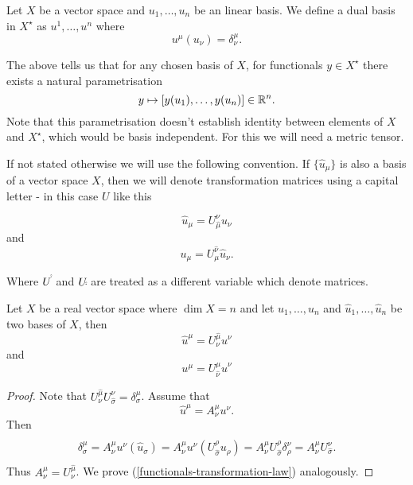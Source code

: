 \documentclass[main.tex]{subfiles}
\begin{document}
\begin{definition}
Let $X$ be a vector space and $u_1, \dots, u_n$ be an linear basis. We define a dual basis in $X^\star$ as $u^1, \dots, u^n$ where
\begin{equation}
u^\mu(u_\nu) = \delta^\mu_\nu. 
\end{equation} 
\end{definition}

The above tells us that for any chosen basis of $X$, for functionals $y\in X^\star$ there exists a natural parametrisation 
\begin{equation}
y \mapsto [y(u_1), \dots, y(u_n)]\in \mathbb{R}^n. 
\end{equation}
Note that this parametrisation doesn't establish identity between elements of $X$ and $X^\star$, which would be basis independent. For this we will need a metric tensor.

If not stated otherwise we will use the following convention. If $\{\hat{u}_\mu\}$ is also a basis of a vector space $X$, then we will denote transformation matrices using a capital letter - in this case $U$ like this

\begin{equation}
\hat{u}_\mu = U^\nu_{\hat{\mu}} u_\nu
\end{equation}
and
\begin{equation}
u_\mu =  U^{\hat{\nu}}_\mu  \hat{u}_\nu.
\end{equation}

Where $U^{\hat{\dot}}$ and $U_{\hat{\dot}}$ are treated as a different variable which denote matrices.

\begin{theorem}
\label{basis-functional-basis-relation}
Let $X$ be a real vector space where $\dim X = n$ and let $u_1, \dots, u_n$ and $\hat{u}_1, \dots, \hat{u}_n$ be two bases of $X$, then
\begin{equation}
\hat{u}^\mu =  U^{\hat{\mu}}_{\nu} u^\nu
\end{equation}
and 
\begin{equation}
\label{functionals-transformation-law}
u^\mu = U^{\mu}_{\hat{\nu}} \hat{u}^\nu
\end{equation}
\end{theorem}
\begin{proof}
Note that $U^{\hat{\mu}}_{\nu} U^{\nu}_{\hat{\sigma}} = \delta^\mu_\sigma$. Assume that 
\begin{equation}
\hat{u}^\mu = A^{\mu}_\nu u^\nu.
\end{equation}
Then
\begin{multline*}
\\
\delta^\mu_\sigma = A^\mu_\nu u^\nu(\hat{u}_\sigma) = A^\mu_\nu u^\nu(U^\rho_{\hat{\sigma}} u_\rho) = 
A^\mu_\nu U^\rho_{\hat{\sigma}} \delta^\nu_\rho = A^\mu_\nu U^\nu_{\hat{\sigma}}.
\\
\end{multline*}
Thus $A^\mu_\nu = U^{\hat{\mu}}_{\nu}$.
We prove (\ref{functionals-transformation-law}) analogously.
\end{proof}
\end{document}
